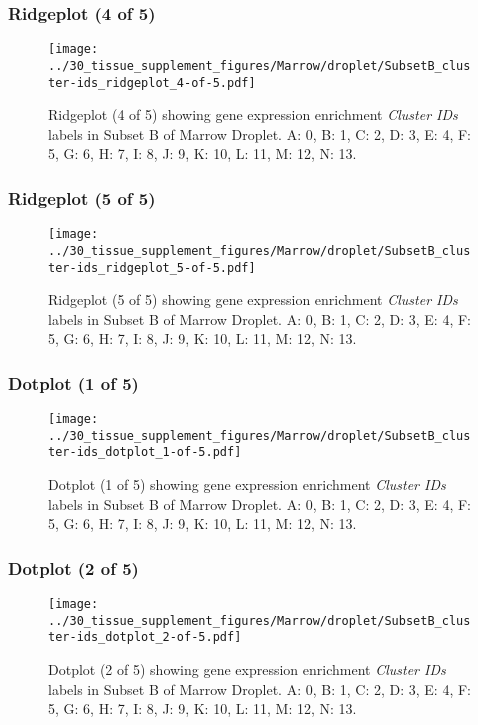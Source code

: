 \clearpage

\subsubsection{Ridgeplot (4 of 5)}
\begin{figure}[h]
\centering
\texttt{[image: ../30\_tissue\_supplement\_figures/Marrow/droplet/SubsetB\_cluster-ids\_ridgeplot\_4-of-5.pdf]}

\caption{ Ridgeplot (4 of 5)  showing gene expression enrichment \emph{Cluster IDs} labels in Subset B of Marrow Droplet. A: 0, B: 1, C: 2, D: 3, E: 4, F: 5, G: 6, H: 7, I: 8, J: 9, K: 10, L: 11, M: 12, N: 13.}
\end{figure}


\clearpage

\subsubsection{Ridgeplot (5 of 5)}
\begin{figure}[h]
\centering
\texttt{[image: ../30\_tissue\_supplement\_figures/Marrow/droplet/SubsetB\_cluster-ids\_ridgeplot\_5-of-5.pdf]}

\caption{ Ridgeplot (5 of 5)  showing gene expression enrichment \emph{Cluster IDs} labels in Subset B of Marrow Droplet. A: 0, B: 1, C: 2, D: 3, E: 4, F: 5, G: 6, H: 7, I: 8, J: 9, K: 10, L: 11, M: 12, N: 13.}
\end{figure}


\clearpage

\subsubsection{Dotplot (1 of 5)}
\begin{figure}[h]
\centering
\texttt{[image: ../30\_tissue\_supplement\_figures/Marrow/droplet/SubsetB\_cluster-ids\_dotplot\_1-of-5.pdf]}

\caption{ Dotplot (1 of 5)  showing gene expression enrichment \emph{Cluster IDs} labels in Subset B of Marrow Droplet. A: 0, B: 1, C: 2, D: 3, E: 4, F: 5, G: 6, H: 7, I: 8, J: 9, K: 10, L: 11, M: 12, N: 13.}
\end{figure}


\clearpage

\subsubsection{Dotplot (2 of 5)}
\begin{figure}[h]
\centering
\texttt{[image: ../30\_tissue\_supplement\_figures/Marrow/droplet/SubsetB\_cluster-ids\_dotplot\_2-of-5.pdf]}

\caption{ Dotplot (2 of 5)  showing gene expression enrichment \emph{Cluster IDs} labels in Subset B of Marrow Droplet. A: 0, B: 1, C: 2, D: 3, E: 4, F: 5, G: 6, H: 7, I: 8, J: 9, K: 10, L: 11, M: 12, N: 13.}
\end{figure}


